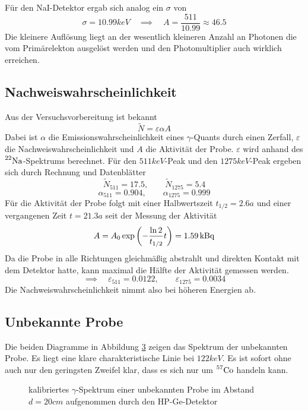		Für den NaI-Detektor ergab sich analog ein $\sigma$ von
		\[
			\sigma  = 10.99 \unit{keV} \quad \implies \quad A = \frac{511}{10.99} \approx 46.5
		\]
		Die kleinere Auflösung liegt an der wesentlich kleineren Anzahl an Photonen die vom Primärelekton ausgelöst werden und den Photomultiplier auch wirklich erreichen.


	\FloatBarrier
	\subsection{Nachweiswahrscheinlichkeit}
	\label{ssec:Nachweiswahrscheinlichkeit}
	
		Aus der Versuchsvorbereitung ist bekannt
		\[
			\tilde{N} = \varepsilon \alpha A
		\]
		Dabei ist $\alpha$ die Emissionswahrscheinlichkeit eines $\gamma$-Quants durch einen Zerfall, $\varepsilon$ die Nachweiswahrscheinlichkeit und $A$ die Aktivität der Probe.
		$\varepsilon$ wird anhand des $\prescript{22}{}{\mathrm{Na}}$-Spektrums berechnet.
		Für den $511\unit{keV}$-Peak und den $1275\unit{keV}$-Peak ergeben sich durch Rechnung und Datenblätter
		\[
			\tilde{N}_{511} = 17.5,\qquad \tilde{N}_{1275} = 5.4
		\]
		\[
			\alpha_{511} = 0.904,\qquad \alpha_{1275} = 0.999
		\]
		Für die Aktivität der Probe folgt mit einer Halbwertszeit $t_{1/2}=2.6\unit{a}$ und einer vergangenen Zeit $t=21.3\unit{a}$ seit der Messung der Aktivität
		\[
			A = A_0\exp\left( -\frac{\ln 2}{t_{1/2}}t \right) = 1.59\, \mathrm{kBq}
		\]
		Da die Probe in alle Richtungen gleichmäßig abstrahlt und direkten Kontakt mit dem Detektor hatte, kann maximal die Hälfte der Aktivität gemessen werden.
		\[
			\implies \quad \varepsilon_{511} = 0.0122,\qquad \varepsilon_{1275} = 0.0034
		\]
		Die Nachweiswahrscheinlichkeit nimmt also bei höheren Energien ab.
	

	\FloatBarrier
	\subsection{Unbekannte Probe}
	\label{ssec:kryptonit}
		Die beiden Diagramme in Abbildung \ref{fig:kryptonit} zeigen das Spektrum der unbekannten Probe.
		Es liegt eine klare charakteristische Linie bei $122\unit{keV}$.
		Es ist sofort ohne auch nur den geringsten Zweifel klar, dass es sich nur um $\prescript{57}{}{\mathrm{Co}}$ handeln kann.
		\begin{figure}[H]
			\begin{subfigure}[b]{\textwidth}
				\centering
				
				\caption{}
				\label{fig:kryptonit-var1}
			\end{subfigure}

			\begin{subfigure}[b]{\textwidth}
				\centering
				
				\caption{}
				\label{fig:kryptonit-var2}
			\end{subfigure}
			\caption{kalibriertes $\gamma$-Spektrum einer unbekannten Probe im Abstand $d=20\unit{cm}$ aufgenommen durch den HP-Ge-Detektor}
			\label{fig:kryptonit}
		\end{figure}
	
	\FloatBarrier

